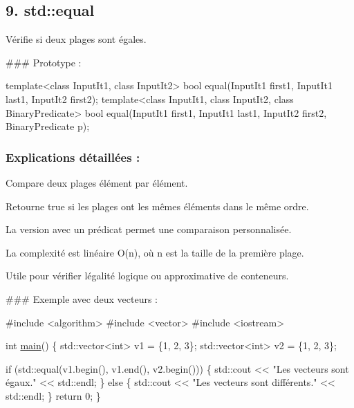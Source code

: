 \subsection*{9. {\bfseries std\+::equal}}

Vérifie si deux plages sont égales.

\#\#\# Prototype \+: 
\begin{DoxyCode}
\textcolor{keyword}{template}<\textcolor{keyword}{class} InputIt1, \textcolor{keyword}{class} InputIt2>
\textcolor{keywordtype}{bool} equal(InputIt1 first1, InputIt1 last1, InputIt2 first2);
\textcolor{keyword}{template}<\textcolor{keyword}{class} InputIt1, \textcolor{keyword}{class} InputIt2, \textcolor{keyword}{class} BinaryPredicate>
\textcolor{keywordtype}{bool} equal(InputIt1 first1, InputIt1 last1, InputIt2 first2, BinaryPredicate p);
\end{DoxyCode}


\subsubsection*{Explications détaillées \+:}


\begin{DoxyItemize}
\item Compare deux plages élément par élément.
\item Retourne {\ttfamily true} si les plages ont les mêmes éléments dans le même ordre.
\item La version avec un prédicat permet une comparaison personnalisée.
\item La complexité est linéaire O(n), où n est la taille de la première plage.
\item Utile pour vérifier l\textquotesingle{}égalité logique ou approximative de conteneurs.
\end{DoxyItemize}

\#\#\# Exemple avec deux vecteurs \+: 
\begin{DoxyCode}
\textcolor{preprocessor}{#include <algorithm>}
\textcolor{preprocessor}{#include <vector>}
\textcolor{preprocessor}{#include <iostream>}

\textcolor{keywordtype}{int} \hyperlink{htop_8c_a3c04138a5bfe5d72780bb7e82a18e627}{main}() \{
    std::vector<int> v1 = \{1, 2, 3\};
    std::vector<int> v2 = \{1, 2, 3\};

    \textcolor{keywordflow}{if} (std::equal(v1.begin(), v1.end(), v2.begin())) \{
        std::cout << \textcolor{stringliteral}{"Les vecteurs sont égaux."} << std::endl;
    \} \textcolor{keywordflow}{else} \{
        std::cout << \textcolor{stringliteral}{"Les vecteurs sont différents."} << std::endl;
    \}
    \textcolor{keywordflow}{return} 0;
\}
\end{DoxyCode}
 



